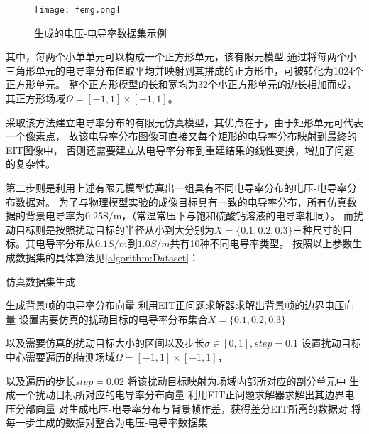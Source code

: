 \begin{figure}[h]
    \centering
    \texttt{[image: femg.png]}
    \caption{生成的电压-电导率数据集示例}
    \label{figure:femg}
\end{figure}

其中，每两个小单单元可以构成一个正方形单元，该有限元模型
通过将每两个小三角形单元的电导率分布值取平均并映射到其拼成的正方形中，可被转化为1024个正方形单元。
整个正方形模型的长和宽均为32个小正方形单元的边长相加而成，其正方形场域$\Omega = \left[-1, 1\right] \times \left[-1, 1\right]$。


采取该方法建立电导率分布的有限元仿真模型，其优点在于，由于矩形单元可代表一个像素点，
故该电导率分布图像可直接又每个矩形的电导率分布映射到最终的EIT图像中，
否则还需要建立从电导率分布到重建结果的线性变换，增加了问题的复杂性。

第二步则是利用上述有限元模型仿真出一组具有不同电导率分布的电压-电导率分布数据对。
为了与物理模型实验的成像目标具有一致的电导率分布，所有仿真数据的背景电导率为0.25S/m，（常温常压下与饱和硫酸钙溶液的电导率相同）。
而扰动目标则是按照扰动目标的半径从小到大分别为$ X = \{0.1, 0.2, 0.3\}$三种尺寸的目标。其电导率分布从$0.1S/m$到$1.0S/m$共有10种不同电导率类型。
按照以上参数生成数据集的具体算法见\cref{algorithm:Dataset}：

\begin{algorithm}[H]
    
    \caption{仿真数据集生成}
    \begin{algorithmic}[1]
        \State 生成背景帧的电导率分布向量
        \State 利用EIT正问题求解器求解出背景帧的边界电压向量
        \State 设置需要仿真的扰动目标的电导率分布集合$X = \{0.1, 0.2, 0.3\}$
        
        以及需要仿真的扰动目标大小的区间以及步长$\sigma \in \left[0, 1\right], step = 0.1$
        \State 设置扰动目标中心需要遍历的待测场域$\Omega = \left[-1, 1\right] \times \left[-1, 1\right]$，

        以及遍历的步长$step=0.02$
        \State 将该扰动目标映射为场域内部所对应的剖分单元中
        \State 生成一个扰动目标所对应的电导率分布向量
        \State 利用EIT正问题求解器求解出其边界电压分部向量
        \State 对生成电压-电导率分布与背景帧作差，获得差分EIT所需的数据对
        \EndFor
        \EndIf
       \EndFor
       \EndFor
       \State 将每一步生成的数据对整合为电压-电导率数据集
    \end{algorithmic}
    \label{algorithm:Dataset}
\end{algorithm}

